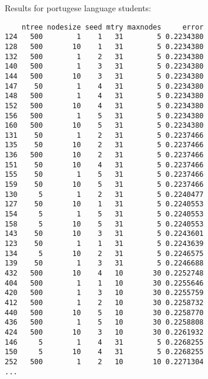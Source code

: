 Results for portugese language students:
\begin{verbatim}
    ntree nodesize seed mtry maxnodes     error
124   500        1    1   31        5 0.2234380
128   500       10    1   31        5 0.2234380
132   500        1    2   31        5 0.2234380
140   500        1    3   31        5 0.2234380
144   500       10    3   31        5 0.2234380
147    50        1    4   31        5 0.2234380
148   500        1    4   31        5 0.2234380
152   500       10    4   31        5 0.2234380
156   500        1    5   31        5 0.2234380
160   500       10    5   31        5 0.2234380
131    50        1    2   31        5 0.2237466
135    50       10    2   31        5 0.2237466
136   500       10    2   31        5 0.2237466
151    50       10    4   31        5 0.2237466
155    50        1    5   31        5 0.2237466
159    50       10    5   31        5 0.2237466
130     5        1    2   31        5 0.2240477
127    50       10    1   31        5 0.2240553
154     5        1    5   31        5 0.2240553
158     5       10    5   31        5 0.2240553
143    50       10    3   31        5 0.2243601
123    50        1    1   31        5 0.2243639
134     5       10    2   31        5 0.2246575
139    50        1    3   31        5 0.2246688
432   500       10    4   10       30 0.2252748
404   500        1    1   10       30 0.2255646
420   500        1    3   10       30 0.2255759
412   500        1    2   10       30 0.2258732
440   500       10    5   10       30 0.2258770
436   500        1    5   10       30 0.2258808
424   500       10    3   10       30 0.2261932
146     5        1    4   31        5 0.2268255
150     5       10    4   31        5 0.2268255
252   500        1    2   10       10 0.2271304
...
\end{verbatim}

